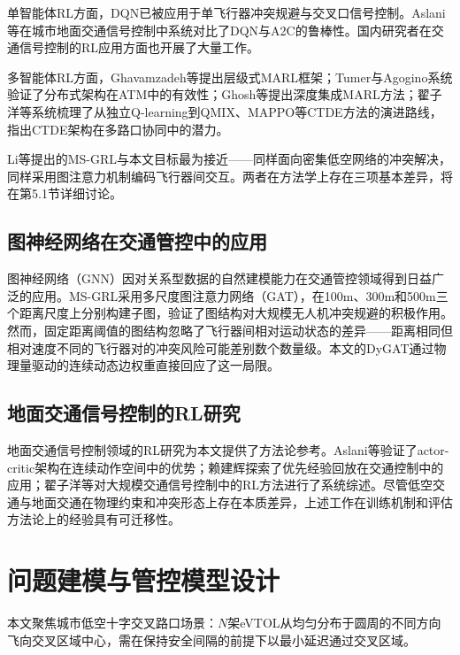 \documentclass[12pt,a4paper,UTF8]{ctexart}
\begin{document}
单智能体RL方面，DQN已被应用于单飞行器冲突规避与交叉口信号控制。Aslani等\cite{ref12}在城市地面交通信号控制中系统对比了DQN与A2C的鲁棒性。国内研究者在交通信号控制的RL应用方面也开展了大量工作\cite{ref15,ref16,ref17,ref18,ref19,ref20,ref21,ref22}。

多智能体RL方面，Ghavamzadeh等\cite{ref23}提出层级式MARL框架；Tumer与Agogino\cite{ref7,ref14,ref24}系统验证了分布式架构在ATM中的有效性；Ghosh等\cite{ref9}提出深度集成MARL方法；翟子洋等\cite{ref13}系统梳理了从独立Q-learning到QMIX、MAPPO等CTDE方法的演进路线，指出CTDE架构在多路口协同中的潜力。

Li等\cite{ref10}提出的MS-GRL与本文目标最为接近——同样面向密集低空网络的冲突解决，同样采用图注意力机制编码飞行器间交互。两者在方法学上存在三项基本差异，将在第5.1节详细讨论。

\subsection{图神经网络在交通管控中的应用}

图神经网络（GNN）因对关系型数据的自然建模能力在交通管控领域得到日益广泛的应用。MS-GRL\cite{ref10}采用多尺度图注意力网络（GAT），在100m、300m和500m三个距离尺度上分别构建子图，验证了图结构对大规模无人机冲突规避的积极作用。然而，固定距离阈值的图结构忽略了飞行器间相对运动状态的差异——距离相同但相对速度不同的飞行器对的冲突风险可能差别数个数量级。本文的DyGAT通过物理量驱动的连续动态边权重直接回应了这一局限。

\subsection{地面交通信号控制的RL研究}

地面交通信号控制领域的RL研究为本文提供了方法论参考。Aslani等\cite{ref12}验证了actor-critic架构在连续动作空间中的优势；赖建辉\cite{ref17}探索了优先经验回放在交通控制中的应用；翟子洋等\cite{ref13}对大规模交通信号控制中的RL方法进行了系统综述。尽管低空交通与地面交通在物理约束和冲突形态上存在本质差异，上述工作在训练机制和评估方法论上的经验具有可迁移性。

\section{问题建模与管控模型设计}

本文聚焦城市低空十字交叉路口场景：$N$架eVTOL从均匀分布于圆周的不同方向飞向交叉区域中心，需在保持安全间隔的前提下以最小延迟通过交叉区域。
\end{document}

